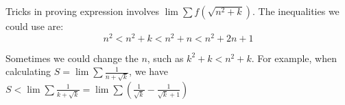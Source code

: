 \begin{example}
    Tricks in proving expression involves $\lim \sum f(\sqrt{n^2 + k})$. The inequalities we could use are:
    \begin{equation}
        n^2 < n^2 + k < n^2 + n < n^2 + 2n + 1
    \end{equation} 
    
    Sometimes we could change the $n$, such as $k^2 + k < n^2 + k$. For example, when calculating $S = \lim \sum \frac{1}{n + \sqrt{k}}$, we have $S < \lim \sum \frac{1}{k + \sqrt{k}} = \lim \sum \left( \frac{1}{\sqrt{k}} - \frac{1}{\sqrt{k} + 1} \right)$
\end{example}


























































































